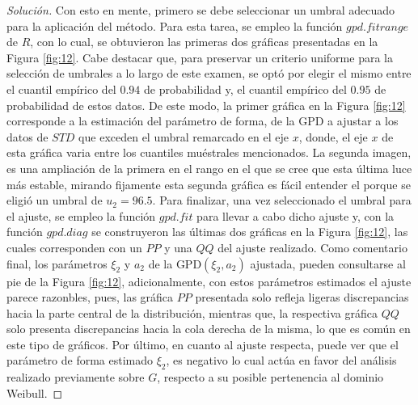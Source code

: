 \documentclass[10.5pt,notitlepage]{article}
\newenvironment{solucion}
  {\begin{proof}[Solución]}
  {\end{proof}}
\theoremstyle{plain}
\begin{document}
\begin{solucion}
Con esto en mente, primero se debe seleccionar un umbral adecuado para la aplicación del método. Para esta tarea, se empleo la función \(gpd.fitrange\) de \(R\), con lo cual, se obtuvieron las primeras dos gráficas presentadas en la Figura \ref{fig:12}. Cabe destacar que, para preservar un criterio uniforme para la selección de umbrales a lo largo de este examen, se optó por elegir el mismo entre el cuantil empírico del \(0.94\) de probabilidad y, el cuantil empírico del \(0.95\) de probabilidad de estos datos. De este modo, la primer gráfica en la Figura \ref{fig:12} corresponde a la estimación del parámetro de forma, de la GPD a ajustar a los datos de \(STD\) que exceden el umbral remarcado en el eje \(x\), donde, el eje \(x\) de esta gráfica varia entre los cuantiles muéstrales mencionados. La segunda imagen, es una ampliación de la primera en el rango en el que se cree que esta última luce más estable, mirando fijamente esta segunda gráfica es fácil entender el porque se eligió un umbral de \(u_2 = 96.5\). Para finalizar, una vez seleccionado el umbral para el ajuste, se empleo la función \(gpd.fit\) para llevar a cabo dicho ajuste y, con la función \(gpd.diag\) se construyeron las últimas dos gráficas en la Figura \ref{fig:12}, las cuales corresponden con un \(PP\) y una \(QQ\) del ajuste realizado. Como comentario final, los parámetros \(\xi_2\) y \(a_2\) de la GPD\((\xi_2,a_2)\) ajustada, pueden consultarse al pie de la Figura \ref{fig:12}, adicionalmente, con estos parámetros estimados el ajuste parece razonbles, pues, las gráfica \(PP\) presentada solo refleja ligeras discrepancias hacia la parte central de la distribución, mientras que, la respectiva gráfica \(QQ\) solo presenta discrepancias hacia la cola derecha de la misma, lo que es común en este tipo de gráficos. Por último, en cuanto al ajuste respecta, puede ver que el parámetro de forma estimado \(\xi_2\), es negativo lo cual actúa en favor del análisis realizado previamente sobre \(G\), respecto a su posible pertenencia al dominio Weibull.


\end{solucion}
\end{document}

